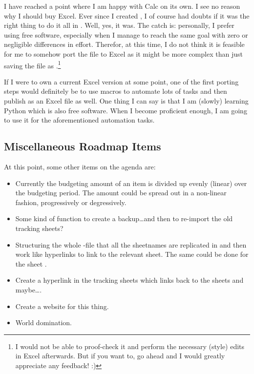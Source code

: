 I have reached a point where I am happy with Calc on its own.
I see no reason why I should buy Excel.
Ever since I created \tfn, I of course had doubts if it was the right thing to do it all in \loc.
Well, yes, it was.
The catch is: personally, I prefer using free software, especially when I manage to reach the same goal with zero or negligible differences in effort.
Therefor, at this time, I do not think it is feasible for me to somehow port the file to Excel as it might be more complex than just saving the file as .\footnote{I would not be able to proof-check it and perform the necessary (style) edits in Excel afterwards.
But if you want to, go ahead and I would greatly appreciate any feedback! :)}

If I were to own a current Excel version at some point, one of the first porting steps would definitely be to use macros to automate lots of tasks and then publish \tfn as an Excel file as well.
One thing I can say is that I am (slowly) learning Python which is also free software.
When I become proficient enough, I am going to use it for the aforementioned automation tasks.

\subsection{Miscellaneous Roadmap Items}
\label{subsec:misc-roadmap-items}

At this point, some other items on the agenda are:
\begin{itemize}
	\item Currently the budgeting amount of an item is divided up evenly (\ie linear) over the budgeting period.
	The amount could be spread out in a non-linear fashion, \eg progressively or degressively.
	\item Some kind of function to create a backup\ldots and then to re-import the old tracking sheets?
	\item Structuring the whole -file that all the sheetnames are replicated in  and then work like hyperlinks to link to the relevant sheet.
	The same could be done for the sheet .
	\item Create a hyperlink in the tracking sheets which links back to the sheets  and maybe\ldots {}.
	\item Create a website for this thing.
	\item World domination.
\end{itemize}


